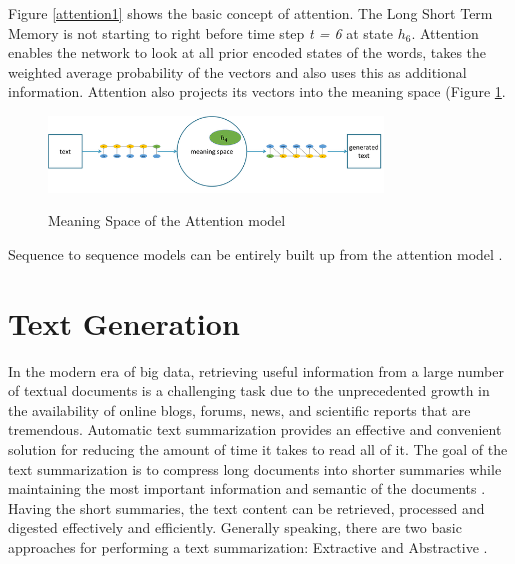 Figure \ref{attention1} shows the basic concept of attention. The Long Short Term Memory is not starting to right before time step \textit{t = 6} at state \textit{\(h_{6}\)}. Attention enables the network to look at all prior encoded states of the words, takes the weighted average probability of the vectors and also uses this as additional information. Attention also projects its vectors into the meaning space (Figure \ref{meaningspace}. 

\begin{figure}
	\begin{center}
		\includegraphics[width=3.5in]{photos/w1-21}\\
		\caption{Meaning Space of the Attention model \cite{mugan}}\label{meaningspace}
	\end{center}
\end{figure}

Sequence to sequence models can be entirely built up from the attention model \cite{attention2}. 

\section{Text Generation}\label{ss:history}

In the modern era of big data, retrieving useful information from a large number of textual documents is a challenging task due to the unprecedented growth in the availability of online blogs, forums, news, and scientific reports that are tremendous. Automatic text summarization provides an effective and convenient solution for reducing the amount of time it takes to read all of it. The goal of the text summarization is to compress long documents into shorter summaries while maintaining the most important information and semantic of the documents \cite{ts-intro} \cite{ts-intro2}. Having the short summaries, the text content can be retrieved, processed and digested effectively and efficiently. 
Generally speaking, there are two basic approaches for performing a text summarization: Extractive and Abstractive \cite{ts-intro3}. 

